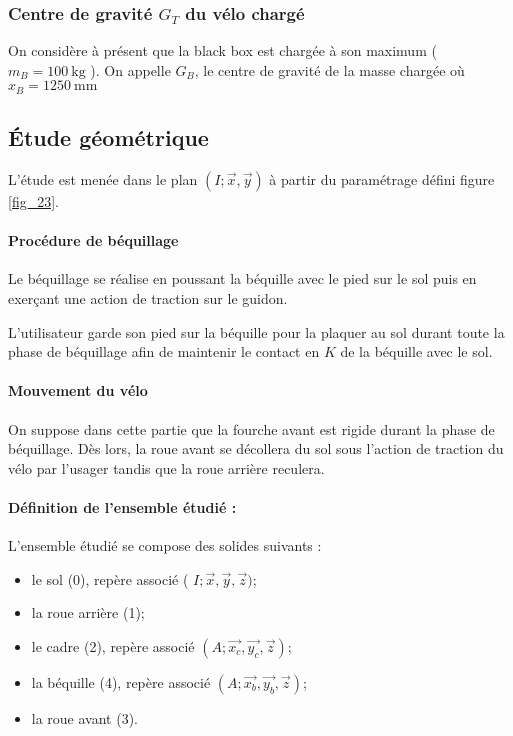 
\subsubsection{Centre de gravité \(G_{T}\) du vélo chargé}
On considère à présent que la black box est chargée à son maximum ( \(m_{B}=100 \mathrm{~kg}\) ). On appelle \(G_{B}\), le centre de gravité de la masse chargée où \(x_{B}=1250 \mathrm{~mm}\)


\subsection{Étude géométrique}
L'étude est menée dans le plan \((I ; \vec{x}, \vec{y})\) à partir du paramétrage défini figure \ref{fig_23}.

\paragraph*{Procédure de béquillage} Le béquillage se réalise en poussant la béquille avec le pied sur le sol puis en exerçant une action de traction sur le guidon.

L'utilisateur garde son pied sur la béquille pour la plaquer au sol durant toute la phase de béquillage afin de maintenir le contact en \(K\) de la béquille avec le sol.

\paragraph*{Mouvement du vélo} On suppose dans cette partie que la fourche avant est rigide durant la phase de béquillage. Dès lors, la roue avant se décollera du sol sous l'action de traction du vélo par l'usager tandis que la roue arrière reculera.

\paragraph*{Définition de l'ensemble étudié :} L'ensemble étudié se compose des solides suivants :
\begin{itemize}
  \item le sol (0), repère associé ( \(I ; \vec{x}, \vec{y}, \vec{z})\);
  \item la roue arrière (1);
  \item le cadre (2), repère associé \(\left(A ; \overrightarrow{x_{c}}, \overrightarrow{y_{c}}, \vec{z}\right)\);
  \item la béquille (4), repère associé \(\left(A ; \overrightarrow{x_{b}}, \overrightarrow{y_{b}}, \vec{z}\right)\);
  \item la roue avant (3).
\end{itemize}

